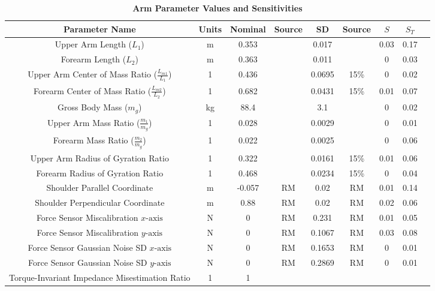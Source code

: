 \begin{table}[!ht]
\caption{
\bf{Arm Parameter Values and Sensitivities}}
\begin{tabular}{|c|c|c c|c c|c c|c|}
\hline
Parameter Name &
Units &
Nominal &
Source &
SD &
Source &
$S$ &
$S_T$ \\ \hline
Upper Arm Length ($L_1$) &
m &
0.353 &
\cite{dempster1955space} &
0.017 &
\cite{dempster1955space} &
0.03 &
0.17 \\
Forearm Length ($L_2$) &
m &
0.363 &
\cite{dempster1955space} &
0.011 &
\cite{dempster1955space} &
0 &
0.03 \\
Upper Arm Center of Mass Ratio ($\frac{L_{m1}}{L_1}$) &
1 &
0.436 &
\cite{winter2009biomechanics} &
0.0695 &
15\% &
0 &
0.02 \\
Forearm Center of Mass Ratio ($\frac{L_{m2}}{L_2}$) &
1 &
0.682 &
\cite{winter2009biomechanics} &
0.0431 &
15\% &
0.01 &
0.07 \\
Gross Body Mass ($m_g$) &
kg &
88.4 &
\cite{fryar2012anthropometric} &
3.1 &
\cite{stunkard1981accuracy} &
0 &
0.02 \\
Upper Arm Mass Ratio ($\frac{m_1}{m_g}$) &
1 &
0.028 &
\cite{winter2009biomechanics} &
0.0029 &
\cite{dempster1955space} &
0 &
0.01 \\
Forearm Mass Ratio ($\frac{m_2}{m_g}$) &
1 &
0.022 &
\cite{winter2009biomechanics} &
0.0025 &
\cite{dempster1955space} &
0 &
0.06 \\
Upper Arm Radius of Gyration Ratio &
1 &
0.322 &
\cite{winter2009biomechanics} &
0.0161 &
15\% &
0.01 &
0.06 \\
Forearm Radius of Gyration Ratio &
1 &
0.468 &
\cite{winter2009biomechanics} &
0.0234 &
15\% &
0 &
0.04 \\
Shoulder Parallel Coordinate &
m &
-0.057 &
RM &
0.02 &
RM &
0.01 &
0.14 \\
Shoulder Perpendicular Coordinate &
m &
0.88 &
RM &
0.02 &
RM &
0.02 &
0.06 \\
Force Sensor Miscalibration $x\text{-axis}$ &
N &
0 &
RM &
0.231 &
RM &
0.01 &
0.05 \\
Force Sensor Miscalibration $y\text{-axis}$ &
N &
0 &
RM &
0.1067 &
RM &
0.03 &
0.08 \\
Force Sensor Gaussian Noise SD $x\text{-axis}$ &
N &
0 &
RM &
0.1653 &
RM &
0 &
0.01 \\
Force Sensor Gaussian Noise SD $y\text{-axis}$ &
N &
0 &
RM &
0.2869 &
RM &
0 &
0.01 \\
Torque-Invariant Impedance Misestimation Ratio &
1 &
1 &
\cite{burdet2006stability} &

\end{tabular}
\end{table}
